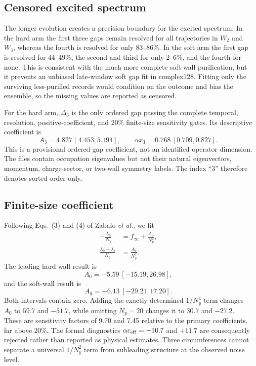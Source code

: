 \documentclass[aps,prb,twocolumn,floatfix,nofootinbib,superscriptaddress]{revtex4-2}
\begin{document}
\subsection{Censored excited spectrum}

The longer evolution creates a precision boundary for the excited spectrum.
In the hard arm the first three gaps remain resolved for all trajectories in
$W_2$ and $W_3$, whereas the fourth is resolved for only 83--86\%.  In the
soft arm the first gap is resolved for 44--49\%, the second and third for only
2--6\%, and the fourth for none.  This is consistent with the much more
complete soft-wall purification, but it prevents an unbiased late-window soft
gap fit in complex128.  Fitting only the surviving less-purified records would
condition on the outcome and bias the ensemble, so the missing values are
reported as censored.

For the hard arm, $\Delta_3$ is the only ordered gap passing the complete
temporal, resolution, positive-coefficient, and 20\% finite-size sensitivity
gates.  Its descriptive coefficient is
\begin{equation}
 A_3=4.827\ [4.453,5.194],\qquad
 \alpha x_3=0.768\ [0.709,0.827].
\end{equation}
This is a provisional ordered-gap coefficient, not an identified operator
dimension.  The files contain occupation eigenvalues but not their natural
eigenvectors, momentum, charge-sector, or two-wall symmetry labels.  The
index ``3'' therefore denotes sorted order only.

\subsection{Finite-size coefficient}

Following Eqs.~(3) and (4) of Zabalo \emph{et al.}, we fit
\begin{align}
 -\frac{\lambda_0}{N_y}
 &=f_\infty+\frac{A_0}{N_y^2},\\
 \frac{\lambda_0-\lambda_i}{N_y}
 &=\frac{A_i}{N_y^2}.
\end{align}
The leading hard-wall result is
\begin{equation}
 A_0=+5.59\ [-15.19,26.98],
\end{equation}
and the soft-wall result is
\begin{equation}
 A_0=-6.13\ [-29.21,17.20].
\end{equation}
Both intervals contain zero.  Adding the exactly determined $1/N_y^4$ term
changes $A_0$ to $59.7$ and $-51.7$, while omitting $N_y=20$ changes it to
$30.7$ and $-27.2$.  These are sensitivity factors of 9.70 and 7.45 relative
to the primary coefficients, far above 20\%.  The formal diagnostics
$\alpha c_{\rm eff}=-10.7$ and $+11.7$ are consequently rejected rather than
reported as physical estimates.  Three circumferences cannot separate a
universal $1/N_y^2$ term from subleading structure at the observed noise level.
\end{document}
